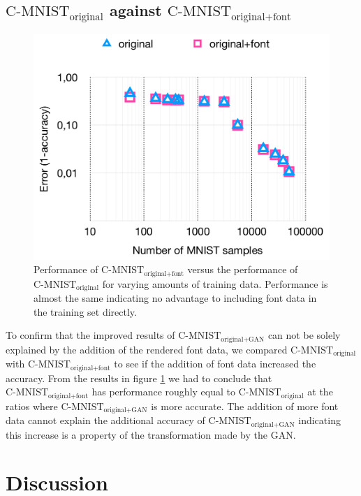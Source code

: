 \documentclass[10pt,twocolumn,letterpaper]{article}
\begin{document}
\subsection{\boldmath\bfseries $\text{C-MNIST}_\text{original}$ against $\text{C-MNIST}_\text{original+font}$}
\begin{figure}[h]
\begin{center}
	\includegraphics[width=0.9\linewidth]{../graph-font-original-comparison.png}
\end{center}
   \caption{Performance of $\text{C-MNIST}_\text{original+font}$ versus the performance of $\text{C-MNIST}_\text{original}$ for varying amounts of training data. Performance is almost the same indicating no advantage to including font data in the training set directly.}
\label{fig:graph-font-original-comparison}
\end{figure}

To confirm that the improved results of $\text{C-MNIST}_\text{original+GAN}$ can not be solely explained by the addition of the rendered font data, we compared $\text{C-MNIST}_\text{original}$ with $\text{C-MNIST}_\text{original+font}$ to see if the addition of font data increased the accuracy. From the results in figure \ref{fig:graph-font-original-comparison} we had to conclude that $\text{C-MNIST}_\text{original+font}$ has performance roughly equal to $\text{C-MNIST}_\text{original}$ at the ratios where $\text{C-MNIST}_\text{original+GAN}$ is more accurate. The addition of more font data cannot explain the additional accuracy of $\text{C-MNIST}_\text{original+GAN}$ indicating this increase is a property of the transformation made by the GAN.


\section{Discussion}
\end{document}
